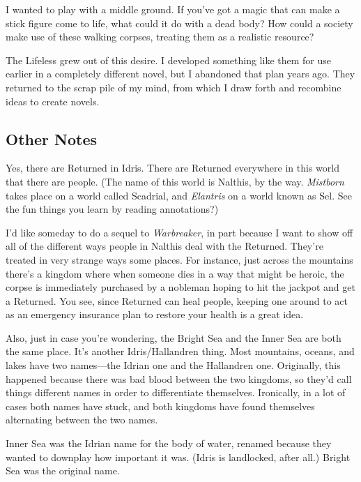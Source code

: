 I wanted to play with a middle ground. If you’ve got a magic that can make a stick figure come to life, what could it do with a dead body? How could a society make use of these walking corpses, treating them as a realistic resource?

The Lifeless grew out of this desire. I developed something like them for use earlier in a completely different novel, but I abandoned that plan years ago. They returned to the scrap pile of my mind, from which I draw forth and recombine ideas to create novels.

\subsection*{Other Notes}

Yes, there are Returned in Idris. There are Returned everywhere in this world that there are people. (The name of this world is Nalthis, by the way. \textit{Mistborn} takes place on a world called Scadrial, and \textit{Elantris} on a world known as Sel. See the fun things you learn by reading annotations?)

I’d like someday to do a sequel to \textit{Warbreaker}, in part because I want to show off all of the different ways people in Nalthis deal with the Returned. They’re treated in very strange ways some places. For instance, just across the mountains there’s a kingdom where when someone dies in a way that might be heroic, the corpse is immediately purchased by a nobleman hoping to hit the jackpot and get a Returned. You see, since Returned can heal people, keeping one around to act as an emergency insurance plan to restore your health is a great idea.

Also, just in case you’re wondering, the Bright Sea and the Inner Sea are both the same place. It’s another Idris/Hallandren thing. Most mountains, oceans, and lakes have two names—the Idrian one and the Hallandren one. Originally, this happened because there was bad blood between the two kingdoms, so they’d call things different names in order to differentiate themselves. Ironically, in a lot of cases both names have stuck, and both kingdoms have found themselves alternating between the two names.

Inner Sea was the Idrian name for the body of water, renamed because they wanted to downplay how important it was. (Idris is landlocked, after all.) Bright Sea was the original name.




